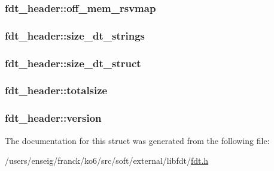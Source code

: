 \hypertarget{structfdt__header_aceb981c230e48eea58d9501b2a52fada}{
\subsubsection[{off\-\_\-mem\-\_\-rsvmap}]{ fdt\-\_\-header\-::off\-\_\-mem\-\_\-rsvmap}}\label{structfdt__header_aceb981c230e48eea58d9501b2a52fada}
\hypertarget{structfdt__header_a64c5ed9e447a81137bf30a6bc3c627ee}{
\subsubsection[{size\-\_\-dt\-\_\-strings}]{ fdt\-\_\-header\-::size\-\_\-dt\-\_\-strings}}\label{structfdt__header_a64c5ed9e447a81137bf30a6bc3c627ee}
\hypertarget{structfdt__header_a5d7585b3780d6e983fe0924a0e23ffcb}{
\subsubsection[{size\-\_\-dt\-\_\-struct}]{ fdt\-\_\-header\-::size\-\_\-dt\-\_\-struct}}\label{structfdt__header_a5d7585b3780d6e983fe0924a0e23ffcb}
\hypertarget{structfdt__header_a142ef62b173b9e13c512bbb231106345}{
\subsubsection[{totalsize}]{ fdt\-\_\-header\-::totalsize}}\label{structfdt__header_a142ef62b173b9e13c512bbb231106345}
\hypertarget{structfdt__header_a5df82a5fef43c5d827478d41e78ed649}{
\subsubsection[{version}]{ fdt\-\_\-header\-::version}}\label{structfdt__header_a5df82a5fef43c5d827478d41e78ed649}


The documentation for this struct was generated from the following file\-:\begin{DoxyCompactItemize}
\item 
/users/enseig/franck/ko6/src/soft/external/libfdt/\hyperlink{fdt_8h}{fdt.\-h}\end{DoxyCompactItemize}

